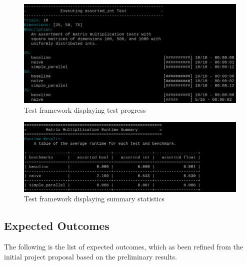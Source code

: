 \documentclass[oneside]{article}
\begin{document}
\begin{figure}[ht!]
\centering
\includegraphics[width=\textwidth]{figures/framework-progress}
\caption{Test framework displaying test progress}
\label{fig:progress}
\end{figure}

\begin{figure}[ht!]
\centering
\includegraphics[width=\textwidth]{figures/framework-summary}
\caption{Test framework displaying summary statistics}
\label{fig:summary}
\end{figure}



\subsection{Expected Outcomes}

The following is the list of expected outcomes, which as been refined from the initial project proposal based on the preliminary results.
\end{document}
